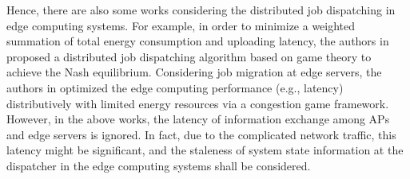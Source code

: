 Hence, there are also some works considering the distributed job dispatching in edge computing systems. For example, in order to minimize a weighted
summation of total energy consumption and uploading latency, the authors in \cite{ToN-Xuchen2016} proposed a distributed job dispatching algorithm based on game theory to achieve the Nash equilibrium. 
Considering job migration at edge servers, the authors in \cite{ToN-xujie2018} optimized the edge computing performance (e.g., latency) distributively with limited energy resources via a congestion game framework.
However, in the above works, the latency of information exchange among APs and edge servers is ignored.
In fact, due to the complicated network traffic, this latency might be significant, and the staleness of system state information at the dispatcher in the edge computing systems shall be considered.


